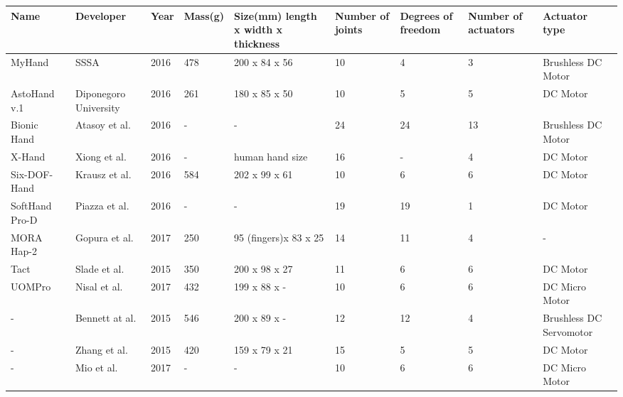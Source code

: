 \documentclass[a4paper, 10pt, conference]{ieeeconf}      %
\begin{document}
\begin{tabular}{l|p{2cm}|p{1cm}|p{1.2cm}|p{2.2cm}|p{1.2cm}|p{1.2cm}|p{1.2cm}|p{2cm}}

Name & Developer & Year & Mass(g) & Size(mm) length x width x thickness & Number of joints & Degrees of freedom & Number of \newline actuators & Actuator type\\
\hline
MyHand~\cite{myhand} & SSSA & 2016 & 478 & 200 x 84 x 56 & 10 & 4 & 3 & Brushless DC Motor\\
\hline
AstoHand v.1~\cite{astohand} & Diponegoro University & 2016 & 261 & 180 x 85 x 50 & 10 & 5 & 5 & DC Motor\\
\hline
Bionic Hand~\cite{bionichand} & Atasoy et al. & 2016 & - & - & 24 & 24 & 13 & Brushless DC Motor\\
\hline
X-Hand~\cite{xhand}& Xiong et al. & 2016 & - & human hand size & 16 & - & 4 & DC Motor\\
\hline
Six-DOF-Hand~\cite{6dofhand} & Krausz et al. & 2016 & 584 & 202 x 99 x 61 & 10 & 6 & 6 & DC Motor\\
\hline
SoftHand Pro-D~\cite{softhand} & Piazza et al. & 2016 & - & - & 19 & 19 & 1 & DC Motor\\
\hline
MORA Hap-2~\cite{morahap2} & Gopura et al. & 2017 & 250 & 95 (fingers)\newline x 83 x 25 & 14 & 11 & 4 & -\\
\hline
Tact~\cite{tact} & Slade et al. & 2015 & 350 & 200 x 98 x 27 & 11 & 6 & 6 & DC Motor\\
\hline
UOMPro~\cite{uompro} & Nisal et al. & 2017 & 432 & 199 x 88 x - & 10 & 6 & 6 & DC Micro Motor\\
\hline
-~\cite{bennett} & Bennett at al. & 2015 & 546 & 200 x 89 x - & 12 & 12 & 4 & Brushless DC Servomotor\\
\hline
-~\cite{zhang} & Zhang et al. & 2015 & 420 & 159 x 79 x 21 & 15 & 5 & 5 & DC Motor\\
\hline
-~\cite{mio} & Mio et al. & 2017 & - & - & 10 & 6 & 6 & DC Micro Motor\\



\end{tabular}

\vspace{3cm}
\end{document}

